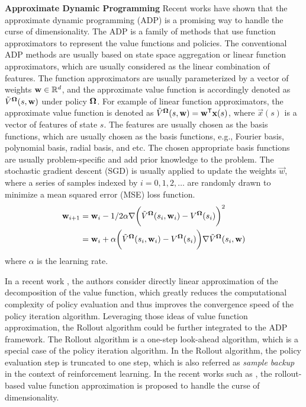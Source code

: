 \noindent\textbf{Approximate Dynamic Programming}
Recent works have shown that the approximate dynamic programming (ADP) is a promising way to handle the curse of dimensionality.
The ADP is a family of methods that use function approximators to represent the value functions and policies.
The conventional ADP methods are usually based on state space aggregation or linear function approximators, which are usually considered as the linear combination of features.
The function approximators are usually parameterized by a vector of weights $\mathbf{w} \in \mathbb{R}^d$, and the approximate value function is accordingly denoted as $\tilde{V}^{\boldsymbol{\Omega}}(s, \mathbf{w})$ under policy $\boldsymbol{\Omega}$.
For example of linear function approximators, the approximate value function is denoted as $\tilde{V}^{\boldsymbol{\Omega}}(s, \mathbf{w}) = \mathbf{w}^\mathsf{T} \mathbf{x}(s)$, where $\vec{x}(s)$ is a vector of features of state $s$.
The features are usually chosen as the basis functions, which are usually chosen as the basis functions, e.g., Fourier basis, polynomial basis, radial basis, and etc.
The chosen appropriate basis functions are usually problem-specific and add prior knowledge to the problem.
The stochastic gradient descent (SGD) is usually applied to update the weights $\vec{w}$, where a series of samples indexed by $i=0,1,2,\dots$ are randomly drawn to minimize a mean squared error (MSE) loss function.
\begin{align*}
    \mathbf{w}_{i+1} &= \mathbf{w}_{i} - 1/2 \alpha \nabla \bigg(
        \tilde{V}^{\boldsymbol{\Omega}}(s_i, \mathbf{w}_i) - V^{\boldsymbol{\Omega}}(s_i)
    \bigg)^2
    \\
    &= \mathbf{w}_{i} + \alpha \bigg(
        \tilde{V}^{\boldsymbol{\Omega}}(s_i, \mathbf{w}_i) - V^{\boldsymbol{\Omega}}(s_i)
    \bigg) \nabla \tilde{V}^{\boldsymbol{\Omega}}(s_i, \mathbf{w})
\end{align*}
where $\alpha$ is the learning rate.

In a recent work \cite{tnet2022-hong}, the authors consider directly linear approximation of the decomposition of the value function, which greatly reduces the computational complexity of policy evaluation and thus improves the convergence speed of the policy iteration algorithm.
Leveraging those ideas of value function approximation, the Rollout algorithm could be further integrated to the ADP framework.
The Rollout algorithm is a one-step look-ahead algorithm, which is a special case of the policy iteration algorithm.
In the Rollout algorithm, the policy evaluation step is truncated to one step, which is also referred as \emph{sample backup} in the context of reinforcement learning.
In the recent works such as \cite{Lv2018-icc,Lv2018-gc,Lv2019,}, the rollout-based value function approximation is proposed to handle the curse of dimensionality.


